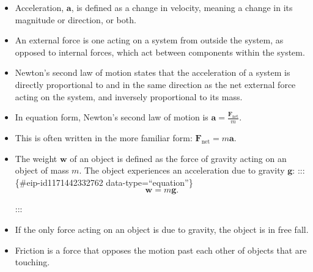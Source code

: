 \documentclass[
]{book}
\begin{document}
\begin{itemize}
\item
  \protect\hypertarget{import-auto-id2667164}{}{Acceleration, \(\textbf{a}{}\), is defined as a change in velocity,
  meaning a change in its magnitude or direction, or
  both.}
\item
  \protect\hypertarget{import-auto-id2677227}{}{An external force is one acting on a system from outside the
  system, as opposed to internal forces, which act between components
  within the system.}
\item
  \protect\hypertarget{import-auto-id2937300}{}{Newton's second law of motion states that the acceleration of a
  system is directly proportional to and in the same direction as the
  net external force acting on the system, and inversely proportional
  to its mass.}
\item
  \protect\hypertarget{import-auto-id3028474}{}{In equation form, Newton's second law of motion is
  \({\textbf{a} = \frac{\textbf{F}_{\text{net}}}{m}}{}\).}
\item
  \protect\hypertarget{import-auto-id2962786}{}{This is often written in the more familiar form:
  \({\textbf{F}_{\text{net}} = m\textbf{a}}{}\).}
\item
  \protect\hypertarget{import-auto-id1487682}{}{The weight \(\textbf{w}{}\) of an object is defined as the force of
  gravity acting on an object of mass \(m{}\). The object experiences an
  acceleration due to gravity \(\textbf{g}{}\):}
  ::: \{\#eip-id1171442332762 data-type=``equation''\}
  \[{\textbf{w} = m\textbf{g}}.\]

  :::
\item
  \protect\hypertarget{import-auto-id3397737}{}{If the only force acting on an object is due to gravity, the object
  is in free fall.}
\item
  \protect\hypertarget{import-auto-id1917983}{}{Friction is a force that opposes the motion past each other of
  objects that are touching.}
\end{itemize}
\end{document}
